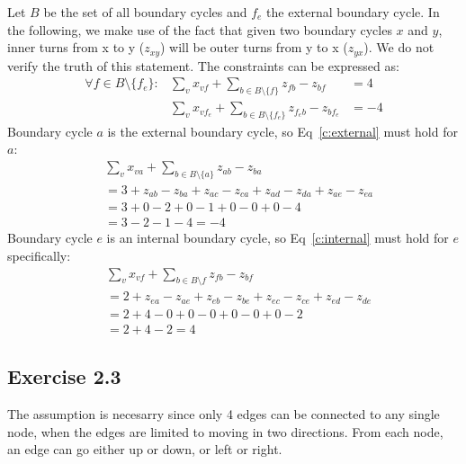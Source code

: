 Let $B$ be the set of all boundary cycles and $f_e$ the external boundary
cycle. In the following, we make use of the fact that given two boundary cycles
$x$ and $y$, inner turns from x to y ($z_{xy}$) will be outer turns from y to x
($z_{yx}$). We do not verify the truth of this statement.  The constraints can
be expressed as:
\begin{align}
  \forall f \in B\setminus \{f_e\} : & \sum_{v} x_{vf} + \sum_{b\in B\setminus \{f\}} z_{fb} - z_{bf} &= 4 
    \label{c:internal} \\
  & \sum_{v} x_{v f_e} + \sum_{b\in B\setminus \{f_e\}} z_{f_e b} - z_{b f_e} &= -4
    \label{c:external}
\end{align}
Boundary cycle $a$ is the external boundary cycle, so Eq~\ref{c:external} must
hold for $a$:
\begin{align*}
  &   \sum_{v} x_{v a} + \sum_{b\in B\setminus \{a\}} z_{a b} - z_{b a} \\
  &=  3 + z_{ab} - z_{ba} + z_{ac} - z_{ca} + z_{ad} - z_{da} + z_{ae} - z_{ea} \\
  &=  3 + 0 - 2 + 0 - 1 + 0 - 0 + 0 - 4 \\
  &=  3 - 2 - 1 - 4 = -4
\end{align*}
Boundary cycle $e$ is an internal boundary cycle, so Eq~\ref{c:internal} must
hold for $e$ specifically:
\begin{align*}
  & \sum_{v} x_{vf} + \sum_{b\in B\setminus f} z_{fb} - z_{bf} \\
  &= 2 + z_{ea} - z_{ae} + z_{eb} - z_{be} + z_{ec} - z_{ce} + z_{ed} - z_{de} \\
  &= 2 + 4 - 0 + 0 - 0 + 0 - 0 + 0 - 2 \\
  &= 2 + 4 - 2 = 4
\end{align*}
\subsection{Exercise 2.3}

The assumption is necesarry since only 4 edges can be connected to any single
node, when the edges are limited to moving in two directions. From each node, an
edge can go either up or down, or left or right.


